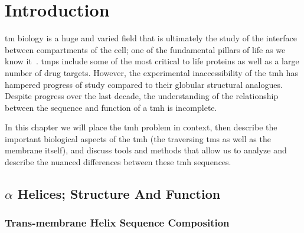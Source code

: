 \chapter{Introduction}

\gls{tm} biology is a huge and varied field  that is ultimately the study of the interface between compartments of the cell; one of the fundamental pillars of life as we know it~\cite{Ladokhin2015}. \gls{tmp}s include some of the most critical to life proteins as well as a large number of drug targets.
However, the experimental inaccessibility of the \gls{tmh} has hampered progress of study compared to their globular structural analogues. Despite progress over the last decade, the understanding of the relationship between the sequence and function of a \gls{tmh} is incomplete.

In this chapter we will place the \gls{tmh} problem in context, then describe the important biological aspects of the \gls{tmh} (the traversing \gls{tms} as well as the membrane itself), and discuss tools and methods that allow us to analyze and describe the nuanced differences between these \gls{tmh} sequences.

\section{$\alpha$ Helices; Structure And Function}

\subsection{Trans-membrane Helix Sequence Composition}

